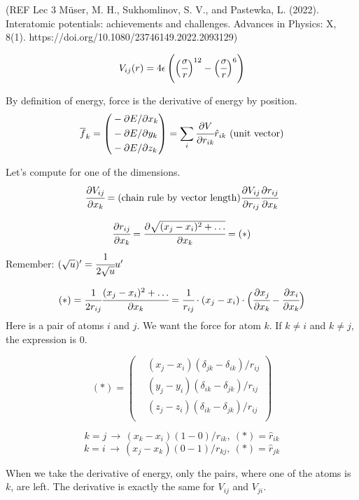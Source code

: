 \documentclass[11pt,a4paper]{article}
\newcommand{\infers}{\,\to\,}
\newcommand{\mat}[1]{\overline{#1}}
\begin{document}
(REF Lec 3 Müser, M. H., Sukhomlinov, S. V., and Pastewka, L. (2022). Interatomic potentials: achievements and challenges. Advances in Physics: X, 8(1). https://doi.org/10.1080/23746149.2022.2093129)

\[
V_{ij}(r) = 4\epsilon \left( \Bigl(\cfrac{\sigma}{r}\Bigr)^{12} - \Bigl(\cfrac{\sigma}{r}\Bigr)^{6} \right)
\]

By definition of energy, force is the derivative of energy by position.
\[
\mat{f}_k = \left( \begin{aligned}
	& - \partial E / \partial x_k \\
	& - \partial E / \partial y_k \\
	& - \partial E / \partial z_k \\
\end{aligned} \right) = \sum_i \cfrac{\partial V}{\partial r_{ik}} {\hat r_{ik}} \text{\ (unit vector)}
\]

Let's compute for one of the dimensions.
\[
\cfrac{\partial V_{ij}}{\partial x_k} = \text{(chain rule by vector length)} \cfrac{\partial V_{ij}}{\partial r_{ij}} \cfrac{\partial r_{ij}}{\partial x_k}
\]

\[ \cfrac{\partial r_{ij}}{\partial x_k} = \cfrac{\partial \sqrt{(x_j-x_i)^2 + \ldots}}{\partial x_k} = (*) \]
Remember: \( (\sqrt{u})' = \cfrac{1}{2\sqrt{u}} u' \)

\[
(*) = \cfrac{1}{2r_{ij}} \cfrac{(x_j-x_i)^2+\ldots}{\partial x_k} = \cfrac{1}{r_{ij}} \cdot (x_j-x_i) \cdot \Bigl(\cfrac{\partial x_j}{\partial x_k} - \cfrac{\partial x_i}{\partial x_k}\Bigr)
\]
Here is a pair of atoms $i$ and $j$. We want the force for atom $k$. If \(k\neq i\) and \(k\neq j\), the expression is 0.

\[
(*) = \left( \begin{aligned}
	& (x_j - x_i) (\delta_{jk} - \delta_{ik}) / r_{ij} \\
	& (y_j - y_i) (\delta_{ik} - \delta_{jk}) / r_{ij} \\
	& (z_j - z_i) (\delta_{ik} - \delta_{jk}) / r_{ij} \\
\end{aligned} \right) 
\]

\[
k=j \infers (x_k-x_i)(1-0)/r_{ik},\ (*) = {\hat r_{ik}}
\]
\[
k=i \infers (x_j-x_k)(0-1)/r_{kj},\ (*) = {\hat r_{jk}}
\]

When we take the derivative of energy, only the pairs, where one of the atoms is \(k\), are left. The derivative is exactly the same for \(V_{ij}\) and \(V_{ji}\).
\end{document}

